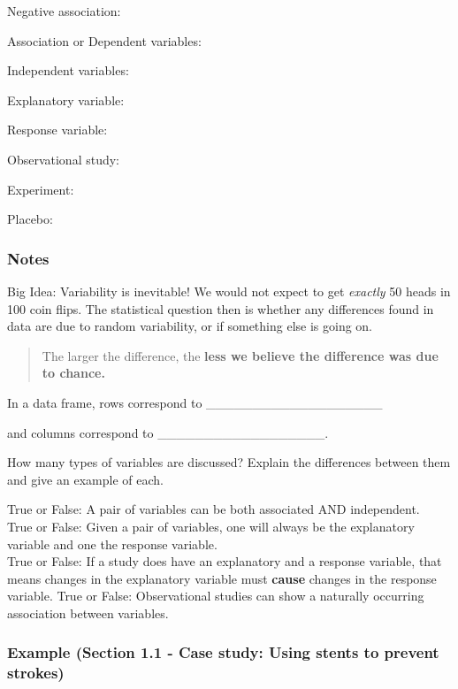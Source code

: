 \documentclass[
]{report}
\newcommand{\rgs}{\vspace{12pt}} %
\newcommand{\rgi}{\hspace{24pt}}  %
\begin{document}
\rgi Negative association:

Association or Dependent variables:
\rgs

Independent variables:
\rgs

Explanatory variable:
\rgs

Response variable:
\rgs

Observational study:
\rgs

Experiment:
\rgs

Placebo:
\rgs

\hypertarget{notes}{%
\subsubsection*{Notes}\label{notes}}

Big Idea: Variability is inevitable! We would not expect to get \emph{exactly} 50 heads in 100 coin flips. The statistical question then is whether any differences found in data are due to random variability, or if something else is going on.

\begin{quote}
The larger the difference, the \textbf{less we believe the difference was due to chance.}
\end{quote}

In a data frame, rows correspond to \_\_\_\_\_\_\_\_\_\_\_\_\_\_\_\_\_\_\_

and columns correspond to \_\_\_\_\_\_\_\_\_\_\_\_\_\_\_\_\_\_.

How many types of variables are discussed? Explain the differences between them and give an example of each.
\rgs
\rgs

True or False: A pair of variables can be both associated AND independent.\\
True or False: Given a pair of variables, one will always be the explanatory variable and one the response variable.\\
True or False: If a study does have an explanatory and a response variable, that means changes in the explanatory variable must \textbf{cause} changes in the response variable.
True or False: Observational studies can show a naturally occurring association between variables.

\hypertarget{example-section-1.1---case-study-using-stents-to-prevent-strokes}{%
\subsubsection*{Example (Section 1.1 - Case study: Using stents to prevent strokes)}\label{example-section-1.1---case-study-using-stents-to-prevent-strokes}}
\end{document}
